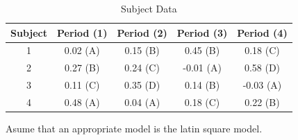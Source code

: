 \documentclass{article}
\begin{document}
\begin{table}[!ht]
	\centering
	\caption{Subject Data}
	\begin{tabular}{c c c c c}
		\hline
		\textbf{Subject} & \textbf{Period (1)} & \textbf{Period (2)} & \textbf{Period (3)} & \textbf{Period (4)} \\
		\hline
		1                & 0.02 (A)            & 0.15 (B)            & 0.45 (B)            & 0.18 (C)            \\
		2                & 0.27 (B)            & 0.24 (C)            & -0.01 (A)           & 0.58 (D)            \\
		3                & 0.11 (C)            & 0.35 (D)            & 0.14 (B)            & -0.03 (A)           \\
		4                & 0.48 (A)            & 0.04 (A)            & 0.18 (C)            & 0.22 (B)            \\
		\hline
	\end{tabular}
\end{table}
Asume that an appropriate model is the latin square model.
\end{document}
